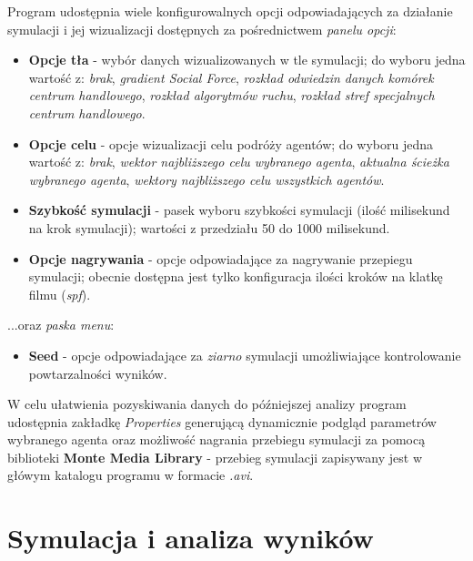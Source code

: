 \documentclass[a4paper, 12pt]{article}
\begin{document}
        Program udostępnia wiele konfigurowalnych opcji odpowiadających za działanie symulacji i jej wizualizacji dostępnych za pośrednictwem \emph{panelu opcji}:

        \begin{itemize}
            \item \textbf{Opcje tła} - wybór danych wizualizowanych w tle symulacji; do wyboru jedna wartość z: \emph{brak}, \emph{gradient Social Force}, \emph{rozkład odwiedzin danych komórek centrum handlowego}, \emph{rozkład algorytmów ruchu}, \emph{rozkład stref specjalnych centrum handlowego}.
            \item \textbf{Opcje celu} - opcje wizualizacji celu podróży agentów; do wyboru jedna wartość z: \emph{brak}, \emph{wektor najbliższego celu wybranego agenta}, \emph{aktualna ścieżka wybranego agenta}, \emph{wektory najbliższego celu wszystkich agentów}.
            \item \textbf{Szybkość symulacji} - pasek wyboru szybkości symulacji (ilość milisekund na krok symulacji); wartości z przedziału 50 do 1000 milisekund.
            \item \textbf{Opcje nagrywania} - opcje odpowiadające za nagrywanie przepiegu symulacji; obecnie dostępna jest tylko konfiguracja ilości kroków na klatkę filmu (\emph{spf}).
        \end{itemize}

        \noindent
        ...oraz \emph{paska menu}:

        \begin{itemize}
            \item \textbf{Seed} - opcje odpowiadające za \emph{ziarno} symulacji umożliwiające kontrolowanie powtarzalności wyników.
        \end{itemize}

        W celu ułatwienia pozyskiwania danych do późniejszej analizy program udostępnia zakładkę \emph{Properties} generującą dynamicznie podgląd parametrów wybranego agenta oraz możliwość nagrania przebiegu symulacji za pomocą biblioteki \textbf{Monte Media Library} - przebieg symulacji zapisywany jest w główym katalogu programu w formacie \emph{.avi}.

\newpage
    \section{Symulacja i analiza wyników}
    \label{sec:sim}

\end{document}
